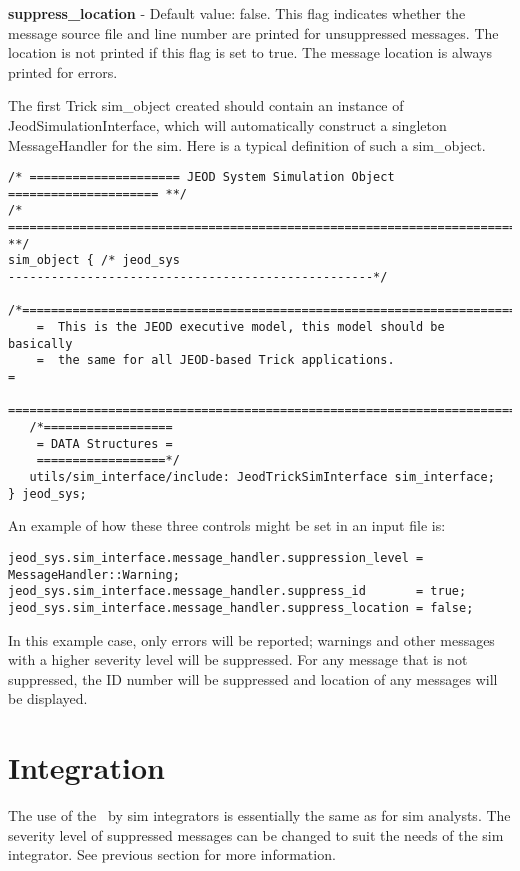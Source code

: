 {\bf suppress\_location} - Default value: false.
This flag indicates whether the message source file and line number
are printed for unsuppressed messages. The location is not printed if this
flag is set to true.
The message location is always printed for errors.

The first Trick sim\_object created should contain an instance of 
JeodSimulationInterface, which
will automatically construct a singleton MessageHandler for the sim.
Here is a typical definition of such a sim\_object.
\begin{verbatim}
/* ===================== JEOD System Simulation Object ===================== **/
/* ========================================================================= **/
sim_object { /* jeod_sys
---------------------------------------------------*/
   /*=========================================================================
    =  This is the JEOD executive model, this model should be basically
    =  the same for all JEOD-based Trick applications.
=
    =========================================================================*/
   /*==================
    = DATA Structures =
    ==================*/
   utils/sim_interface/include: JeodTrickSimInterface sim_interface;
} jeod_sys;
\end{verbatim}


An example of how these three controls might be set in an input file is:
\begin{verbatim}
jeod_sys.sim_interface.message_handler.suppression_level = MessageHandler::Warning;
jeod_sys.sim_interface.message_handler.suppress_id       = true;
jeod_sys.sim_interface.message_handler.suppress_location = false;
\end{verbatim}
In this example case, only errors will be reported; warnings and other
messages with a higher severity level will be suppressed.
For any message that is not suppressed, the ID number will be suppressed and location
of any messages will be displayed.

\section{Integration}
The use of the \MessageHandlerDesc\ by sim integrators is essentially the
same as for sim analysts. The severity level of suppressed messages
can be changed to suit the needs of the sim integrator. See previous section
for more information.

